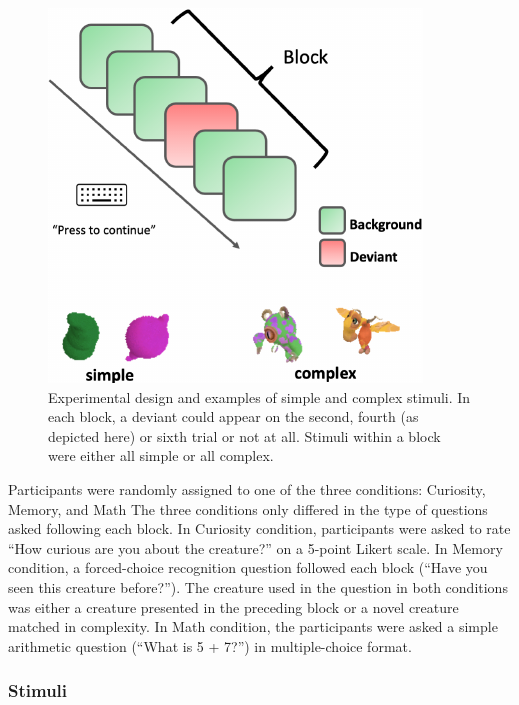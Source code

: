 \documentclass[10pt, letterpaper]{article}
\newenvironment{CodeChunk}{}{}
\begin{document}
\begin{CodeChunk}
\begin{figure}[h]

{\centering \includegraphics{figs/experimental_design-1} 

}

\caption[Experimental design and examples of simple and complex stimuli]{Experimental design and examples of simple and complex stimuli. In each block, a deviant could appear on the second, fourth (as depicted here) or sixth trial or not at all. Stimuli within a block were either all simple or all complex.}\label{fig:experimental_design}
\end{figure}
\end{CodeChunk}

Participants were randomly assigned to one of the three conditions:
Curiosity, Memory, and Math The three conditions only differed in the
type of questions asked following each block. In Curiosity condition,
participants were asked to rate ``How curious are you about the
creature?'' on a 5-point Likert scale. In Memory condition, a
forced-choice recognition question followed each block (``Have you seen
this creature before?''). The creature used in the question in both
conditions was either a creature presented in the preceding block or a
novel creature matched in complexity. In Math condition, the
participants were asked a simple arithmetic question (``What is 5 +
7?'') in multiple-choice format.

\hypertarget{stimuli}{%
\subsubsection{Stimuli}\label{stimuli}}
\end{document}
